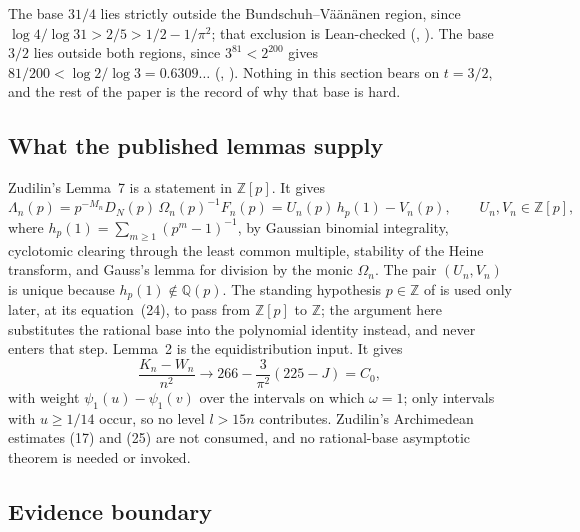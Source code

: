 \documentclass[11pt]{article}
\begin{document}
The base $31/4$ lies strictly outside the Bundschuh--V\"a\"an\"anen region,
since $\log4/\log31>2/5>1/2-1/\pi^2$; that exclusion is Lean-checked
(,
).
The base $3/2$ lies outside both regions, since $3^{81}<2^{200}$ gives
$81/200<\log2/\log3=0.6309\ldots$
(,
).
Nothing in this section bears on $t=3/2$, and the rest of the paper is the
record of why that base is hard.

\subsection*{What the published lemmas supply}

Zudilin's Lemma~7 is a statement in $\mathbb Z[p]$.  It gives
\[
  \Lambda_n(p)=p^{-M_n}D_N(p)\,\Omega_n(p)^{-1}F_n(p)
    =U_n(p)\,h_p(1)-V_n(p),
  \qquad U_n,V_n\in\mathbb Z[p],
\]
where $h_p(1)=\sum_{m\ge1}(p^m-1)^{-1}$, by Gaussian binomial integrality,
cyclotomic clearing through the least common multiple, stability of the Heine
transform, and Gauss's lemma for division by the monic $\Omega_n$.  The pair
$(U_n,V_n)$ is unique because $h_p(1)\notin\mathbb Q(p)$.  The standing
hypothesis $p\in\mathbb Z$ of \cite{zudilin2004} is used only later, at its
equation~(24), to pass from $\mathbb Z[p]$ to $\mathbb Z$; the argument here
substitutes the rational base into the polynomial identity instead, and never
enters that step.  Lemma~2 is the equidistribution input.  It gives
\[
  \frac{K_n-W_n}{n^2}\longrightarrow 266-\frac3{\pi^2}(225-J)=C_0 ,
\]
with weight $\psi_1(u)-\psi_1(v)$ over the intervals on which $\omega=1$; only
intervals with $u\ge1/14$ occur, so no level $l>15n$ contributes.  Zudilin's
Archimedean estimates (17) and (25) are not consumed, and no rational-base
asymptotic theorem is needed or invoked.

\subsection*{Evidence boundary}
\end{document}
